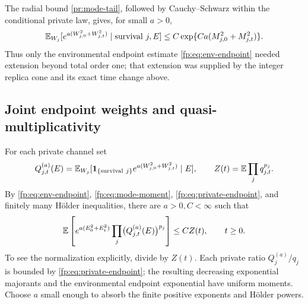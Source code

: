 The radial bound \eqref{pr:mode-tail}, followed by
Cauchy--Schwarz within the conditional private law, gives, for small
$a>0$,
\begin{equation}\label{fp:eq:private-endpoint}
 \mathbb E_{W_j}[e^{a(W_{j,0}^2+W_{j,t}^2)}\mid
                  \mathrm{survival}\ j,E]
 \le C\exp\{Ca(M_{j,0}^2+M_{j,t}^2)\}.
\end{equation}
Thus only the environmental endpoint estimate
\eqref{fp:eq:env-endpoint} needed extension beyond total order one;
that extension was supplied by the integer replica cone and its
exact time change above.

\subsection{Joint endpoint weights and quasi-multiplicativity}
For each private channel set
\[
 Q_{j,t}^{(a)}(E)=
 \mathbb E_{W_j}[\mathbf 1_{\{\mathrm{survival}\ j\}}
             e^{a(W_{j,0}^2+W_{j,t}^2)}\mid E],\qquad
 Z(t)=\mathbb E\prod_jq_{j,t}^{p_j}.
\]
By \eqref{fp:eq:env-endpoint}, \eqref{fp:eq:mode-moment}, \eqref{fp:eq:private-endpoint}, and finitely many H\"older inequalities, there are $a>0,C<\infty$ such that
\begin{equation}\label{fp:eq:joint-EP}
 \mathbb E\left[e^{a(E_0^2+E_t^2)}
            \prod_j\bigl(Q_{j,t}^{(a)}(E)\bigr)^{p_j}\right]
 \le CZ(t),\qquad t\ge0.
\end{equation}
To see the normalization explicitly, divide by $Z(t)$. Each private ratio $Q_j^{(a)}/q_j$ is bounded by \eqref{fp:eq:private-endpoint}; the resulting decreasing exponential majorants and the environmental endpoint exponential have uniform moments. Choose $a$ small enough to absorb the finite positive exponents and H\"older powers.

